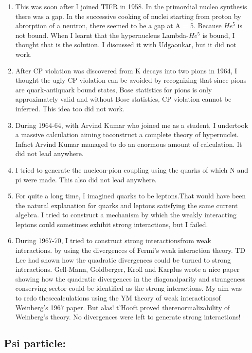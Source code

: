 \begin{enumerate}
\itemsep=0pt
\item This was soon after I joined TIFR in 1958. In the primordial nucleo 
synthesis there was a gap. In the successive cooking of nuclei starting 
from proton by abrorption of a neutron, there seemed to be a gap at A = 
5. Because $He^5$ is not bound. When I learnt that the hypernucleus 
Lambda-$He^5$ is bound, I thought that is the solution. I discussed it 
with Udgaonkar, but it did not work.
\item After CP violation was discovered from K decays into two pions in 
1964, I thought the ugly CP violation can be avoided by recognizing that 
since pions are quark-antiquark bound states, Bose statistics for pions 
is only approximately valid and without Bose statistics, CP violation 
cannot be inferred. This idea too did not work.
\item During 1964-64, with Arvind Kumar who joined me as a studen\-t, I 
undertook a massive calculation aiming to\break construct a complete theory of 
hypernuclei. Infact Arvind Kumar managed to do an enormous amount of 
calculation. It did not lead anywhere.
\item I tried to generate the nucleon-pion coupling using the quarks of 
which N and pi were made. This also did not lead anywhere.
\item For quite a long time, I imagined quarks to be leptons.\break That would have 
been the natural explanation for quarks and leptons satisfying the same 
current algebra. I tried to construct a mechanism by which the weakly 
interacting leptons could sometimes exhibit strong interactions, but I 
failed.
\item During 1967-70, I tried to construct strong interactions\break from weak 
interactions. by using the divergences of Fermi's weak interaction 
theory. TD Lee had shown how the quadra\-tic divergences could be turned 
to strong interactions. Gell-Mann, Goldberger, Kroll and Karplus wrote a 
nice paper showing how the quadratic divergences in the diagonal\break parity 
and strangeness conserving sector could be identified as the strong 
interactions. My aim was to redo these\break calculations using the YM theory 
of weak interactions\break of Weinberg's 1967 paper. But alas! t'Hooft proved 
the\break renormalizability of Weinberg's theory. No divergences were left to 
generate strong interactions!
\end{enumerate}

\subsection*{Psi particle:}

